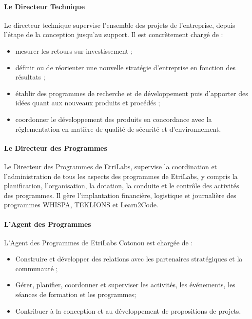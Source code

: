 \paragraph{Le Directeur Technique}
$ $\\Le directeur technique supervise l'ensemble des projets de l’entreprise, depuis l'étape de la conception jusqu'au support. Il est concrètement chargé de :
\begin{itemize}
\item[\textbullet] mesurer les retours sur investissement ;
\item[\textbullet] définir ou de réorienter une nouvelle stratégie d'entreprise en fonction des résultats ;
\item[\textbullet] établir des programmes de recherche et de développement puis d’apporter des idées quant aux nouveaux produits et procédés ;
\item[\textbullet] coordonner le développement des produits en concordance avec la réglementation en matière de qualité de sécurité et d'environnement.
\end{itemize}

\paragraph{Le Directeur des Programmes}
$ $\\Le Directeur des Programmes de EtriLabs, supervise la coordination et l'administration de tous les aspects des programmes de EtriLabs, y compris la planification, l'organisation, la dotation, la conduite et le contrôle des activités des programmes.
Il gère l'implantation financière, logistique et journalière des programmes WHISPA, TEKLIONS et Learn2Code.

\paragraph{L’Agent des Programmes} 
$ $\\L’Agent des Programmes de EtriLabs Cotonou est chargée de :
\begin{itemize}
\item[\textbullet] Construire et développer des relations avec les partenaires stratégiques et la communauté ;
\item[\textbullet] Gérer, planifier, coordonner et superviser les activités, les événements, les séances de formation et les programmes;
\item[\textbullet] Contribuer à la conception et au développement de propositions de projets.
\end{itemize}

